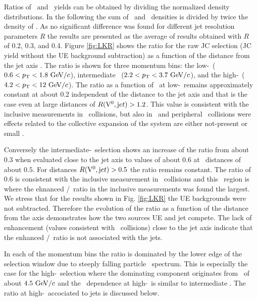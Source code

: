 Ratios of \lda\ and \ks\ yields can be obtained by dividing the normalized density distributions. 
In the following the sum of \lda\ and \alda\ densities is divided by twice the density of \ks.
As no significant difference was found for different jet resolution parameters $R$ the results are presented as the average of results obtained with $R$ of 0.2, 0.3, and 0.4. 
Figure \ref{fig:LKR} shows the ratio for the raw JC selection (JC yield without the UE background subtraction) as a function of the distance from the jet axis \rvzerojet.
The ratio is shown for three momentum bins: the low-\pt\ ($0.6 <p_{\mathrm{T}} <1.8~\mathrm{GeV}/c$), intermediate \pt\ ($2.2 < p_{\mathrm{T}} < 3.7~\mathrm{GeV}/c$), and the high-\pt\ ($4.2 < p_{\mathrm{T}} < 12~\mathrm{GeV}/c$). 
The ratio as a function of \rvzerojet\ at low-\pt\ remains approximately constant at about $0.2$ independent of the distance to the jet axis and that is the case even at large distances of $R({\rm V}^0,{\mathrm jet}) > 1.2$. 
This value is consistent with the inclusive measurements in \pPb\ collisions, but also in \pp\ and peripheral \PbPb\ collisions were effects related to the collective expansion of the system are either not-present or small \cite{Abelev:2014uua}.

Conversely the intermediate-\pt\ selection shows an increase of the ratio from about $0.3$ when evaluated close to the jet axis to values of about $0.6$ at \rvzerojet\ distances of about $0.5$.
For distances $R({\rm V}^0,{\mathrm jet}) > 0.5$ the ratio remains constant.
The ratio of $0.6$ is consistent with the inclusive measurement in \pPb\ collisions \cite{Abelev:2013haa} and this \pt\ region is where the ehnanced \lda/\ks\ ratio in the inclusive measurements was found the largest.
We stress that for the results shown in Fig. \ref{fig:LKR} the UE backgrounds were not subtracted.
Therefore the evolution of the ratio as a function of the distance from the axis demonstrates how the two sources UE and jet compete.
The lack of enhancement (values consistent with \pp\ collisions) close to the jet axis indicate that the enhanced \lda/\ks\ ratio is not associated with the jets.

In each of the momentum bins the ratio is dominated by the lower edge of the selection window due to steeply falling particle \pt\ spectrum. 
This is especially the case for the high-\pt\ selection where the dominating component originates from \pt\ of about $4.5~\mathrm{GeV}/c$ and the \rvzerojet\ dependence at high-\pt\ is similar to intermediate \pt. The ratio at high-\pt\ accociated to jets is discussed below.

